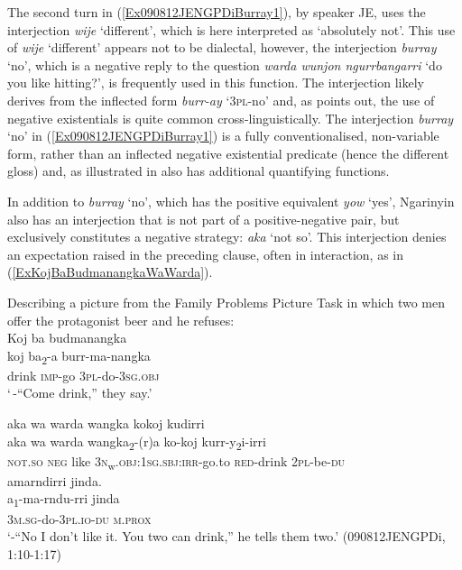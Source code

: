 \documentclass[output=paper,colorlinks,citecolor=brown]{langscibook}
\begin{document}
The second turn in (\ref{Ex090812JENGPDiBurray1}), by speaker JE, uses the interjection \textit{wije} `different', which is here interpreted as `absolutely not'. This use of \textit{wije} `different' appears not to be dialectal, however, the interjection \textit{burray} `no', which is a negative reply to the question \textit{warda wunjon ngurrbangarri} `do you like hitting?', is frequently used in this function. The interjection likely derives from the inflected form \textit{burr-ay} `3\textsc{pl}-no' and, as \citet{Veselinova2013neg.exist} points out, the use of negative existentials is quite common cross-linguistically. The interjection \textit{burray} `no' in (\ref{Ex090812JENGPDiBurray1}) is a fully conventionalised, non-variable form, rather than an inflected negative existential predicate (hence the different gloss) and, as illustrated in  also has additional quantifying functions.

In addition to \textit{burray} `no', which has the positive equivalent \textit{yow} `yes', Ngarinyin also has an interjection that is not part of a positive-negative pair, but exclusively constitutes a negative strategy: \textit{aka} `not so'. This interjection denies an expectation raised in the preceding clause, often in interaction, as in (\ref{ExKojBaBudmanangkaWaWarda}).
\begin{exe}
\ex \label{ExKojBaBudmanangkaWaWarda}
{Describing a picture from the Family Problems Picture Task \citep{SanRoqueEtAl2012} in which two men offer the protagonist beer and he refuses:} \\
\glll Koj ba budmanangka \\
    koj ba\textsubscript{2}-a burr-ma-nangka \\
    drink \textsc{imp}-go 3\textsc{pl}-do-3\textsc{sg.obj} \\
    \trans `\,-``Come drink,'' they say.' \\
\smallskip

\glll aka wa warda wangka kokoj kudirri \\
    aka wa warda wangka\textsubscript{2}-(r)a ko-koj kurr-y\textsubscript{2}i-irri \\
    \textsc{not.so} \textsc{neg} like 3\textsc{n}\textsubscript{w}.\textsc{obj:1sg.sbj:irr}-go.to \textsc{red}-drink 2\textsc{pl}-be-\textsc{du}\\

\glll amarndirri jinda.\\
        a\textsubscript{1}-ma-rndu-rri jinda \\
        3\textsc{m.sg}-do-3\textsc{pl}.\textsc{io}-\textsc{du} \textsc{m.prox}\\

    \trans `-``No I don't like it. You two can drink,'' he tells them two.' (090812JENGPDi, 1:10-1:17)
\end{exe}
\end{document}

